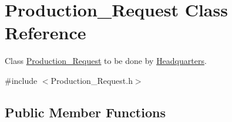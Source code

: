 \hypertarget{class_production___request}{}\section{Production\+\_\+\+Request Class Reference}
\label{class_production___request}


Class \hyperlink{class_production___request}{Production\+\_\+\+Request} to be done by \hyperlink{class_headquarters}{Headquarters}.  




{\ttfamily \#include $<$Production\+\_\+\+Request.\+h$>$}

\subsection*{Public Member Functions}
